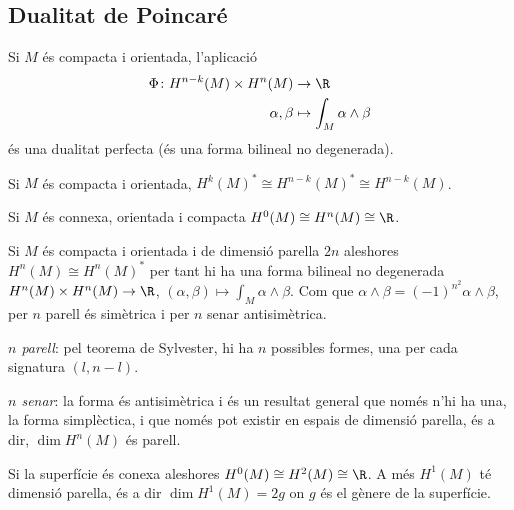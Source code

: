 \documentclass[12pt,twocolumn]{article}
\begin{document}
\subsection{Dualitat de Poincaré}
\begin{theorem}
	Si \( M \) és compacta i orientada, l'aplicació
	\begin{align*}
		\Phi \colon H^{n-k}(M) \times H^n(M) &  \to \R \\
		\alpha, \beta & \mapsto \int_M \alpha \wedge \beta
	\end{align*}
	és una dualitat perfecta (és una forma bilineal no degenerada).
\end{theorem}
\begin{proposition}
	Si \( M \) és compacta i orientada, \( H^k(M)^\ast \cong H^{n-k}(M)^\ast \cong
	H^{n-k}(M) \). 
\end{proposition}
\begin{observation}
	Si \( M \) és connexa, orientada i compacta \( H^0(M) \cong H^n(M) \cong \R \).
\end{observation}

\begin{observation}
	Si \( M \) és compacta i orientada i de dimensió parella \( 2n \) aleshores \( H^n(M)
	\cong H^n(M)^\ast \) per tant hi ha una forma bilineal no degenerada \( H^n(M) \times
	H^n(M) \to \R \), \( (\alpha,\beta) \mapsto \int_M \alpha \wedge \beta \). Com que \(
	\alpha \wedge \beta = (-1)^{n^2} \alpha \wedge \beta \), per \( n \) parell és simètrica
	i per \( n \) senar antisimètrica. 
	\begin{points}
	\item \emph{\( n \) parell}: pel teorema de Sylvester, hi ha \( n \) possibles formes,
		una per cada signatura \( (l, n-l) \). 
	\item \emph{\( n \) senar}: la forma és antisimètrica i és un resultat general que només
		n'hi ha una, la forma simplèctica, i que només pot existir en espais de dimensió
		parella, és a dir, \( \dim H^n(M) \) és parell. 
	\end{points}
\end{observation}

\begin{observation}
	Si la superfície és conexa aleshores \( H^0(M) \cong H^2(M) \cong \R \). A més \( H^1(M)
	\) té dimensió parella, és a dir \( \dim H^1(M) = 2g \) on \( g \) és el gènere de la
	superfície. 
\end{observation}
\end{document}

